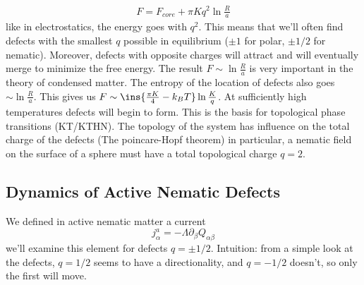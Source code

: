 \begin{align}
    \boxed{F = F_{core} + \pi Kq^2\ln\frac{R}{a}}
\end{align}
like in electrostatics, the energy goes with \(q^2\). This means that we'll often find defects with the smallest \(q\) possible in equilibrium (\(\pm 1\) for polar, \(\pm 1/2\) for nematic). Moreover, defects with opposite charges will attract and will eventually merge to minimize the free energy. The result \(F \sim \ln\frac{R}{a}\) is very important in the theory of condensed matter. The entropy of the location of defects also goes \(\sim\ln\frac{R}{a}\). This gives us \(F\sim \ins{\frac{\pi K}{4}-k_B T}\ln\frac{K}{q}\). At sufficiently high temperatures defects will begin to form. This is the basis for topological phase transitions (KT/KTHN). The topology of the system has influence on the total charge of the defects (The poincare-Hopf theorem) in particular, a nematic field on the surface of a sphere must have a total topological charge \(q=2\).
\subsection{Dynamics of Active Nematic Defects}
We defined in active nematic matter a current
\begin{equation}
    j_\alpha^a = -\Lambda\partial_\beta Q_{\alpha\beta}
\end{equation}
we'll examine this element for defects \(q = \pm 1/2\). Intuition: from a simple look at the defects, \(q=1/2\) seems to have a directionality, and \(q=-1/2\) doesn't, so only the first will move.
